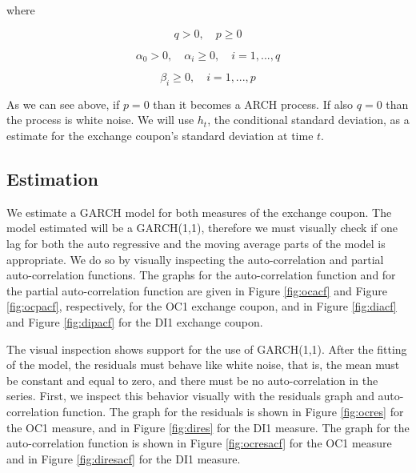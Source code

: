\documentclass[cic,tc, english]{iiufrgs}
\begin{document}
    where

    $$q > 0, \quad   p \geq 0$$

    $$\alpha_0 > 0, \quad  \alpha_i \geq 0, \quad  i=1,...,q$$

    $$\beta_i \geq 0, \quad  i=1,...,p$$

    As we can see above, if $p = 0$ than it becomes a ARCH process. If also $q = 0$ than the process is white noise. We will use $h_t$, the conditional standard deviation, as a estimate for the exchange coupon's standard deviation at time $t$.

\subsection{Estimation} \label{chapter_estimation}

    We estimate a GARCH model for both measures of the exchange coupon. The model estimated will be a GARCH(1,1), therefore we must visually check if one lag for both the auto regressive and the moving average parts of the model is appropriate. We do so by visually inspecting the auto-correlation and partial auto-correlation functions. The graphs for the auto-correlation function and for the partial auto-correlation function are given in Figure \ref{fig:ocacf} and Figure \ref{fig:ocpacf}, respectively, for the OC1 exchange coupon, and in Figure \ref{fig:diacf} and Figure \ref{fig:dipacf} for the DI1 exchange coupon.

    

    

    

    

    The visual inspection shows support for the use of GARCH(1,1). After the fitting of the model, the residuals must behave like white noise, that is, the mean must be constant and equal to zero, and there must be no auto-correlation in the series. First, we inspect this behavior visually with the residuals graph and auto-correlation function. The graph for the residuals is shown in Figure \ref{fig:ocres} for the OC1 measure, and in Figure \ref{fig:dires} for the DI1 measure. The graph for the auto-correlation function is shown in Figure \ref{fig:ocresacf} for the OC1 measure and in Figure \ref{fig:diresacf} for the DI1 measure.

    

    
\end{document}
